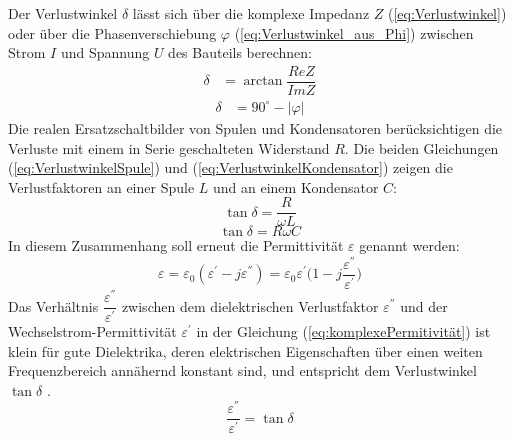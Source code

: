 Der Verlustwinkel $\delta$ lässt sich über die komplexe Impedanz $Z$ (\ref{eq:Verlustwinkel}) oder über die Phasenverschiebung $\varphi$ (\ref{eq:Verlustwinkel_aus_Phi}) zwischen Strom $I$ und Spannung $U$ des Bauteils berechnen: 
\begin{align}
\label{eq:Verlustwinkel}
\delta &= \arctan \dfrac{ReZ}{ImZ}
\end{align}
\begin{align}
\label{eq:Verlustwinkel_aus_Phi}
\delta &= 90^\circ - |\varphi|
\end{align}
Die realen Ersatzschaltbilder von Spulen und Kondensatoren berücksichtigen die Verluste mit einem in Serie geschalteten Widerstand $R$. Die beiden Gleichungen (\ref{eq:VerlustwinkelSpule}) und (\ref{eq:VerlustwinkelKondensator}) zeigen die Verlustfaktoren an einer Spule $L$ und an einem Kondensator $C$:
\begin{equation}\label{eq:VerlustwinkelSpule}
\tan \delta = \dfrac{R}{\omega L}
\end{equation}
\begin{equation} \label{eq:VerlustwinkelKondensator}
\tan \delta = R \omega C
\end{equation}
In diesem Zusammenhang soll erneut die Permittivität $\varepsilon$ genannt werden:
\begin{equation} \label{eq:komplexePermitivität}
\varepsilon=\varepsilon_0(\varepsilon^{'}-j\varepsilon^{''})=\varepsilon_0\varepsilon^{'}\big(1-j\dfrac{\varepsilon^{''}}{\varepsilon^{'}}\big)
\end{equation}
Das Verhältnis $\dfrac{\varepsilon^{''}}{\varepsilon^{'}}$ zwischen dem dielektrischen Verlustfaktor $\varepsilon^{''}$ und der Wechselstrom-Permittivität $\varepsilon^{'}$ in der Gleichung (\ref{eq:komplexePermitivität}) ist klein für gute Dielektrika, deren elektrischen Eigenschaften über einen weiten Frequenzbereich annähernd konstant sind, und entspricht dem Verlustwinkel $\tan\delta$ \cite{elliott1981antenna}. 
\begin{equation} \label{eq:VerlustwinkelEpsilonPermitivität}
\dfrac{\varepsilon^{''}}{\varepsilon^{'}}=\tan\delta
\end{equation}
\newpage

